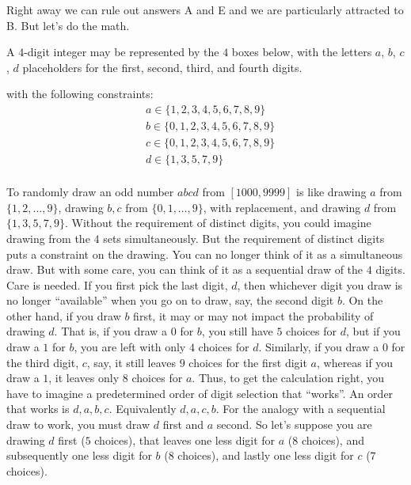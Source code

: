 \documentclass[12pt]{article}
\begin{document}
Right away we can rule out answers A and E and we are particularly attracted to B. But let's do the math.

A $4$-digit integer may be represented by the $4$ boxes below, with the letters $a$, $b$, $c$, $d$ placeholders for the first, second, third, and fourth digits.

\begin{center}
\end{center}
with the following constraints:
\begin{align*}
& a \in \{1,2,3,4,5,6,7,8,9\} \\
& b \in \{0,1,2,3,4,5,6,7,8,9\} \\
& c \in \{0,1,2,3,4,5,6,7,8,9\} \\
& d \in \{1,3,5,7,9\} \\
\end{align*}

To randomly draw an odd number $abcd$ from $[1000,9999]$ is like drawing $a$ from $\{1,2,\ldots,9\}$, drawing $b,c$ from $\{0,1,\ldots,9\}$, with replacement, and drawing $d$ from $\{1,3,5,7,9\}$. Without the requirement of distinct digits, you could imagine drawing from the $4$ sets simultaneously. But the requirement of distinct digits puts a constraint on the drawing. You can no longer think of it as a simultaneous draw. But with some care, you can think of it as a sequential draw of the $4$ digits. Care is needed. If you first pick the last digit, $d$, then whichever digit you draw is no longer ``available'' when you go on to draw, say, the second digit $b$. On the other hand, if you draw $b$ first, it may or may not impact the probability of drawing $d$. That is, if you draw a $0$ for $b$, you still have $5$ choices for $d$, but if you draw a $1$ for $b$, you are left with only $4$ choices for $d$. Similarly, if you draw a $0$ for the third digit, $c$, say, it still leaves $9$ choices for the first digit $a$, whereas if you draw a $1$, it leaves only $8$ choices for $a$. Thus, to get the calculation right, you have to imagine a predetermined order of digit selection that ``works''. An order that works is $d,a,b,c$. Equivalently $d,a,c,b$. For the analogy with a sequential draw to work, you must draw $d$ first and $a$ second. So let's suppose you are drawing $d$ first ($5$ choices), that leaves one less digit for $a$ ($8$ choices), and subsequently one less digit for $b$ ($8$ choices), and lastly one less digit for $c$ ($7$ choices).
\end{document}
